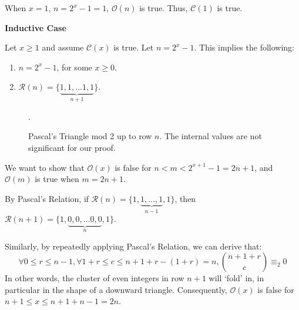 \documentclass{article}
\newcommand{\pred}{\mathcal{O}}
\newcommand{\conject}{\mathcal{C}}
\newcommand{\modrow}{\mathcal{R}}
\newcommand{\drawemptyrow}[4]{
    \node at (#2/4, #3/4) {#4};
    \node at (#2/-4, #3/4) {#4};
  }
\newcommand{\drawrow}[4]{
  \drawemptyrow{#1}{#2}{#3}{#4}
  \foreach \i in {0,...,#1}{
    \node at (#2/-4-\i/-2,#3/4){#4};
  }
}
\newcommand{\drawoddtriangle}[2]{
  \foreach \i in {0,...,7}{
    \drawemptyrow{\i}{#1+0+\i}{#2+7-\i}{1}
   }
   \drawrow{7}{#1+7}{#2+21}{1}
  }
\begin{document}
When $x = 1$, $n=2^x-1=1$, $\pred(n)$ is true. Thus, $\conject(1)$ is true.

\begin{center}\item\textbf{Inductive Case} \end{center}

Let $x\geq 1$ and assume $\conject(x)$ is true. Let $n = 2^x-1$. This implies the following:
\begin{enumerate}
  \item $n = 2^x - 1$, for some $x \geq 0$.
  \item $\modrow(n) = \{\underbrace{1,1,...1,1}_{n+1}\}$.
\end{enumerate}

\begin{figure}[H]
\centering
{}
\caption {Pascal's Triangle mod 2 up to row $n$. The internal values are not significant for our proof.}.
\end{figure}

We want to show that $\pred(x)$ is false for $n < m < 2^{x+1}-1 = 2n+1$, and $\pred(m)$ is true when $m = 2n+1$.

By Pascal's Relation, if $\modrow(n) = \{1,\underbrace{1,...,1}_{n-1},1\}$, 
then $\modrow(n+1) = \{1,\underbrace{0,0,...0,0}_{n},1\}$.

\begin{figure}[H]
\centering
{}
\end{figure}

Similarly, by repeatedly applying Pascal's Relation, we can derive that:
$$
\forall 0 \leq r \leq n-1, \forall 1+r\leq c \leq n+1+r-(1+r)=n, {n+1+r \choose c} \equiv_2 0
$$
In other words, the cluster of even integers in row $n+1$ will `fold' in, in particular in the shape of a downward triangle. Consequently, $\pred(x)$ is false for $n+1\leq x \leq n+1+n-1 = 2n$.

\begin{figure}[H]
\centering
{}
\end{figure}
\end{document}
